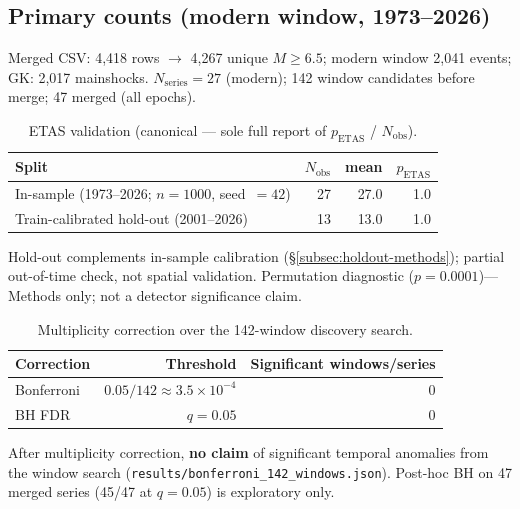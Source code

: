 \documentclass[draft]{agujournal2019}
\begin{document}
\subsection{Primary counts (modern window, 1973--2026)}
\label{subsec:primary-counts}

Merged CSV: 4{,}418 rows $\to$ 4{,}267 unique $M \ge 6.5$; modern window
2{,}041 events; GK: 2{,}017 mainshocks.
$N_\mathrm{series}=27$ (modern); 142 window candidates before merge; 47 merged
(all epochs).

\begin{table}[htbp]
\centering
\caption{ETAS validation (canonical --- sole full report of $p_\mathrm{ETAS}$ / $N_\mathrm{obs}$).}
\label{tab:etas_validation}
\begin{tabular}{lrrr}
\hline
Split & $N_\mathrm{obs}$ & mean & $p_\mathrm{ETAS}$ \\
\hline
In-sample (1973--2026; $n=1000$, seed~$=42$) & 27 & 27.0 & 1.0 \\
Train-calibrated hold-out (2001--2026) & 13 & 13.0 & 1.0 \\
\hline
\end{tabular}
\end{table}

\noindent Hold-out complements in-sample calibration (\S\ref{subsec:holdout-methods});
partial out-of-time check, not spatial validation.
Permutation diagnostic ($p=0.0001$)---Methods only; not a detector significance claim.

\begin{table}[htbp]
\centering
\caption{Multiplicity correction over the 142-window discovery search.}
\label{tab:bonferroni_142}
\begin{tabular}{lrr}
\hline
Correction & Threshold & Significant windows/series \\
\hline
Bonferroni & $0.05/142 \approx 3.5\times 10^{-4}$ & 0 \\
BH FDR & $q = 0.05$ & 0 \\
\hline
\end{tabular}
\end{table}

\noindent After multiplicity correction, \textbf{no claim} of significant temporal
anomalies from the window search (\texttt{results/bonferroni\_142\_windows.json}).
Post-hoc BH on 47 merged series (45/47 at $q=0.05$) is exploratory only.

\noindent{}
\end{document}
